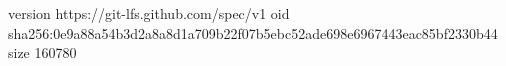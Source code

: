 version https://git-lfs.github.com/spec/v1
oid sha256:0e9a88a54b3d2a8a8d1a709b22f07b5ebc52ade698e6967443eac85bf2330b44
size 160780

